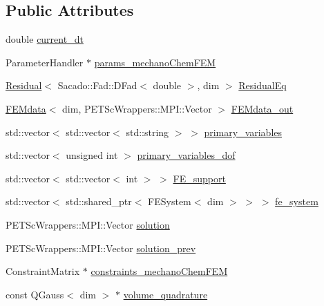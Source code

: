 \subsection*{Public Attributes}
\begin{DoxyCompactItemize}
\item 
double \mbox{\hyperlink{classmechano_chem_f_e_m_a68c7b36b181a92a91945137308e74a6d}{current\+\_\+dt}}
\item 
Parameter\+Handler $\ast$ \mbox{\hyperlink{classmechano_chem_f_e_m_ae9ff200523ba41f15a09a1d39af96649}{params\+\_\+mechano\+Chem\+F\+EM}}
\item 
\mbox{\hyperlink{class_residual}{Residual}}$<$ Sacado\+::\+Fad\+::\+D\+Fad$<$ double $>$, dim $>$ \mbox{\hyperlink{classmechano_chem_f_e_m_adeaa7307c79088ccde0e35feb27eb0b0}{Residual\+Eq}}
\item 
\mbox{\hyperlink{class_f_e_mdata}{F\+E\+Mdata}}$<$ dim, P\+E\+T\+Sc\+Wrappers\+::\+M\+P\+I\+::\+Vector $>$ \mbox{\hyperlink{classmechano_chem_f_e_m_af7b22336bf40c3a2865dff2cb708136d}{F\+E\+Mdata\+\_\+out}}
\item 
std\+::vector$<$ std\+::vector$<$ std\+::string $>$ $>$ \mbox{\hyperlink{classmechano_chem_f_e_m_a4933860ad833b7b9bd2b8effee5c36d6}{primary\+\_\+variables}}
\item 
std\+::vector$<$ unsigned int $>$ \mbox{\hyperlink{classmechano_chem_f_e_m_a20e37946082ad677ffab164a6dead8b3}{primary\+\_\+variables\+\_\+dof}}
\item 
std\+::vector$<$ std\+::vector$<$ int $>$ $>$ \mbox{\hyperlink{classmechano_chem_f_e_m_ab0e06106bfe2ab795399d91169290e8a}{F\+E\+\_\+support}}
\item 
std\+::vector$<$ std\+::shared\+\_\+ptr$<$ F\+E\+System$<$ dim $>$ $>$ $>$ \mbox{\hyperlink{classmechano_chem_f_e_m_abeb9cdd6078108148320406c68bfa0d1}{fe\+\_\+system}}
\item 
P\+E\+T\+Sc\+Wrappers\+::\+M\+P\+I\+::\+Vector \mbox{\hyperlink{classmechano_chem_f_e_m_ae539da5c193ce7d8d07f654067f111ca}{solution}}
\item 
P\+E\+T\+Sc\+Wrappers\+::\+M\+P\+I\+::\+Vector \mbox{\hyperlink{classmechano_chem_f_e_m_ab5b94542feace0c45c2c69696ce9a266}{solution\+\_\+prev}}
\item 
Constraint\+Matrix $\ast$ \mbox{\hyperlink{classmechano_chem_f_e_m_ae2063c17722c7eae9e91a4ad6b353b34}{constraints\+\_\+mechano\+Chem\+F\+EM}}
\item 
const Q\+Gauss$<$ dim $>$ $\ast$ \mbox{\hyperlink{classmechano_chem_f_e_m_a7e2363a91f6f1626f463f3a06108c03b}{volume\+\_\+quadrature}}

\end{DoxyCompactItemize}
